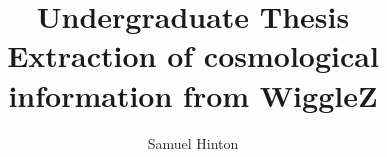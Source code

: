 \documentclass[titlesmallcaps, examinerscopy, copyrightpage]{uqthesis}
\begin{document}

\hypersetup{pageanchor=true}

\title{Undergraduate Thesis\\ \vspace{0.5 cm} Extraction of cosmological information from WiggleZ}
\author{Samuel Hinton}

\renewcommand{\degreetext}{in partial fulfilment of the Bachelor of Science (Honours) degree\\ in the
discipline of Physics}

\frontmatter

\titlepage
\end{document}
